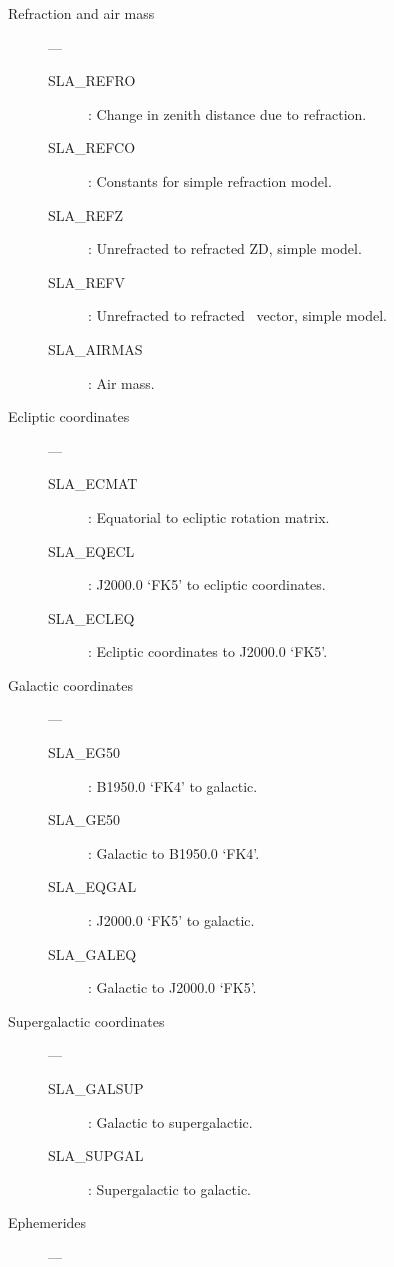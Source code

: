 \begin{description}
\item [Refraction and air mass] ---

\begin{description}
\item [SLA\_REFRO] : Change in zenith distance due to refraction.
\item [SLA\_REFCO] : Constants for simple refraction model.
\item [SLA\_REFZ] : Unrefracted to refracted ZD, simple model.
\item [SLA\_REFV] : Unrefracted to refracted \azel\ vector, simple model.
\item [SLA\_AIRMAS] : Air mass.
\end{description}

\item [Ecliptic coordinates] ---

\begin{description}
\item [SLA\_ECMAT] : Equatorial to ecliptic rotation matrix.
\item [SLA\_EQECL] : J2000.0 `FK5' to ecliptic coordinates.
\item [SLA\_ECLEQ] : Ecliptic coordinates to J2000.0 `FK5'.
\end{description}

\item [Galactic coordinates] ---

\begin{description}
\item [SLA\_EG50] : B1950.0 `FK4' to galactic.
\item [SLA\_GE50] : Galactic to B1950.0 `FK4'.
\item [SLA\_EQGAL] : J2000.0 `FK5' to galactic.
\item [SLA\_GALEQ] : Galactic to J2000.0 `FK5'.
\end{description}

\item [Supergalactic coordinates] ---

\begin{description}
\item [SLA\_GALSUP] : Galactic to supergalactic.
\item [SLA\_SUPGAL] : Supergalactic to galactic.
\end{description}

\item [Ephemerides] ---


\end{description}
